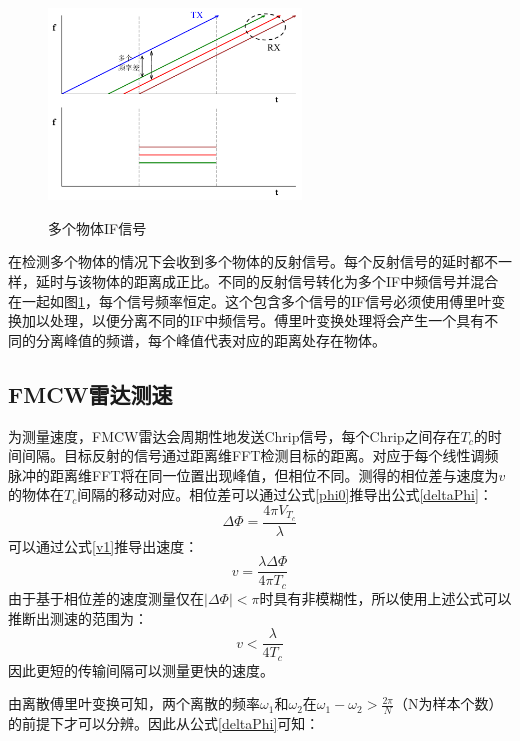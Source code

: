 \begin{figure}[htbp]
	\centering
	\includegraphics[width=0.6\textwidth]{figures/ifs.pdf}\\
	\caption{多个物体IF信号}
	\label{IFS}
\end{figure}


在检测多个物体的情况下会收到多个物体的反射信号。每个反射信号的延时都不一样，延时与该物体的距离成正比。不同的反射信号转化为多个IF中频信号并混合在一起如图\ref{IFS}，每个信号频率恒定。这个包含多个信号的IF信号必须使用傅里叶变换加以处理，以便分离不同的IF中频信号。傅里叶变换处理将会产生一个具有不同的分离峰值的频谱，每个峰值代表对应的距离处存在物体。


\subsection{FMCW雷达测速}
为测量速度，FMCW雷达会周期性地发送Chrip信号，每个Chrip之间存在$T_c$的时间间隔。目标反射的信号通过距离维FFT检测目标的距离。对应于每个线性调频脉冲的距离维FFT将在同一位置出现峰值\cite{rao2017introduction}，但相位不同。测得的相位差与速度为$v$的物体在$T_c$间隔的移动对应。相位差可以通过公式\eqref{phi0}推导出公式\eqref{deltaPhi}：
\begin{equation}
	\Delta \Phi = \frac{4\pi V_{T_c}}{\lambda}
	\label{deltaPhi}
\end{equation}
可以通过公式\eqref{v1}推导出速度：
\begin{equation}
	v = \frac{\lambda \Delta \Phi}{4\pi T_c}
	\label{v1}
\end{equation}
由于基于相位差的速度测量仅在$\lvert \Delta \Phi \rvert < \pi $时具有非模糊性\cite{atlas1973doppler}，所以使用上述公式可以推断出测速的范围为：
\begin{equation}
	v< \frac{\lambda}{4T_c}
\end{equation}
因此更短的传输间隔可以测量更快的速度。

由离散傅里叶变换\cite{wang1984fast}可知，两个离散的频率$\omega_1$和$\omega_2$在$\omega_1 - \omega_2 > \frac{2\pi}{N}$（N为样本个数）的前提下才可以分辨。因此从公式\eqref{deltaPhi}可知：


